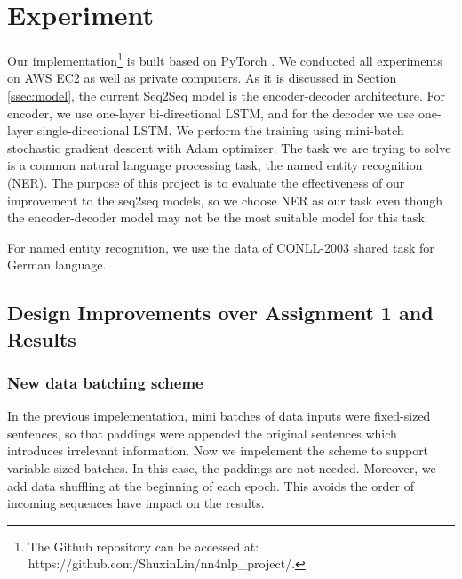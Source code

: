 \documentclass[11pt,a4paper]{article}
\begin{document}
\section{Experiment}

Our implementation\footnote{The Github repository can be accessed at: https://github.com/ShuxinLin/nn4nlp\_project/.} is built based on PyTorch \cite{paszke2017automatic}. We conducted all experiments on AWS EC2 as well as private computers. As it is discussed in Section \ref{ssec:model}, the current Seq2Seq model is the encoder-decoder architecture. For encoder, we use one-layer bi-directional LSTM, and for the decoder we use one-layer single-directional LSTM. We perform the training using mini-batch stochastic gradient descent with Adam optimizer. The task we are trying to solve is a common natural language processing task, the named entity recognition (NER). The purpose of this project is to evaluate the effectiveness of our improvement to the seq2seq models, so we choose NER as our task even though the encoder-decoder model may not be the most suitable model for this task.

For named entity recognition, we use the data of CONLL-2003 shared task \cite{tjongkimsang2003conll} for German language. 




\subsection{Design Improvements over Assignment 1 and Results}



\subsubsection{New data batching scheme}
In the previous impelementation, mini batches of data inputs were fixed-sized sentences, so that paddings were appended the original sentences which introduces irrelevant information. Now we impelement the scheme to support variable-sized batches. In this case, the paddings are not needed. Moreover, we add data shuffling at the beginning of each epoch. This avoids the order of incoming sequences have impact on the results.
\end{document}
